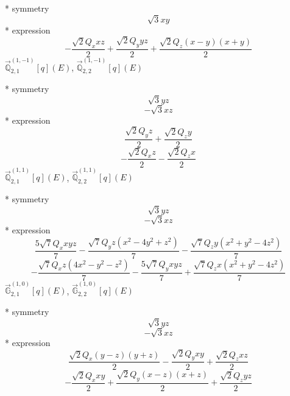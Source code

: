 \documentclass[fleqn,8pt]{jsarticle}
\begin{document}
\noindent\quad ** symmetry
\begin{dmath*}
\sqrt{3} x y
\end{dmath*}
\noindent\quad ** expression
\begin{dmath*}
- \frac{\sqrt{2} Q_{x} x z}{2} + \frac{\sqrt{2} Q_{y} y z}{2} + \frac{\sqrt{2} Q_{z} \left(x - y\right) \left(x + y\right)}{2}
\end{dmath*}
\noindent\quad $\vec{\mathbb{Q}}_{2,1}^{(1,-1)}[q](E)$, $\vec{\mathbb{Q}}_{2,2}^{(1,-1)}[q](E)$

\noindent\quad ** symmetry
\begin{dmath*}
\sqrt{3} y z
\end{dmath*}
\begin{dmath*}
- \sqrt{3} x z
\end{dmath*}
\noindent\quad ** expression
\begin{dmath*}
\frac{\sqrt{2} Q_{y} z}{2} + \frac{\sqrt{2} Q_{z} y}{2}
\end{dmath*}
\begin{dmath*}
- \frac{\sqrt{2} Q_{x} z}{2} - \frac{\sqrt{2} Q_{z} x}{2}
\end{dmath*}
\noindent\quad $\vec{\mathbb{Q}}_{2,1}^{(1,1)}[q](E)$, $\vec{\mathbb{Q}}_{2,2}^{(1,1)}[q](E)$

\noindent\quad ** symmetry
\begin{dmath*}
\sqrt{3} y z
\end{dmath*}
\begin{dmath*}
- \sqrt{3} x z
\end{dmath*}
\noindent\quad ** expression
\begin{dmath*}
\frac{5 \sqrt{7} Q_{x} x y z}{7} - \frac{\sqrt{7} Q_{y} z \left(x^{2} - 4 y^{2} + z^{2}\right)}{7} - \frac{\sqrt{7} Q_{z} y \left(x^{2} + y^{2} - 4 z^{2}\right)}{7}
\end{dmath*}
\begin{dmath*}
- \frac{\sqrt{7} Q_{x} z \left(4 x^{2} - y^{2} - z^{2}\right)}{7} - \frac{5 \sqrt{7} Q_{y} x y z}{7} + \frac{\sqrt{7} Q_{z} x \left(x^{2} + y^{2} - 4 z^{2}\right)}{7}
\end{dmath*}
\noindent\quad $\vec{\mathbb{G}}_{2,1}^{(1,0)}[q](E)$, $\vec{\mathbb{G}}_{2,2}^{(1,0)}[q](E)$

\noindent\quad ** symmetry
\begin{dmath*}
\sqrt{3} y z
\end{dmath*}
\begin{dmath*}
- \sqrt{3} x z
\end{dmath*}
\noindent\quad ** expression
\begin{dmath*}
\frac{\sqrt{2} Q_{x} \left(y - z\right) \left(y + z\right)}{2} - \frac{\sqrt{2} Q_{y} x y}{2} + \frac{\sqrt{2} Q_{z} x z}{2}
\end{dmath*}
\begin{dmath*}
- \frac{\sqrt{2} Q_{x} x y}{2} + \frac{\sqrt{2} Q_{y} \left(x - z\right) \left(x + z\right)}{2} + \frac{\sqrt{2} Q_{z} y z}{2}
\end{dmath*}
\end{document}
